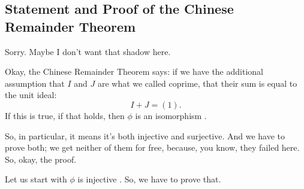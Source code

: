 \subsection{Statement and Proof of the Chinese Remainder Theorem}

\begin{speech}[00:05:25 - 00:06:11]
Sorry. Maybe I don't want that shadow here. 

Okay, the Chinese Remainder Theorem says: if we have the additional assumption that $I$ and $J$ are what we called coprime, that their sum is equal to the unit ideal:
\[
I + J = (1).
\]
 If this is true, if that holds, then $\phi$ is an isomorphism .

So, in particular, it means it's both injective and surjective. And we have to prove both; we get neither of them for free, because, you know, they failed here. So, okay, the proof. 

Let us start with $\phi$ is injective . So, we have to prove that.
\end{speech}

\begin{content}
\end{content}

\begin{hidden}
\end{hidden}

